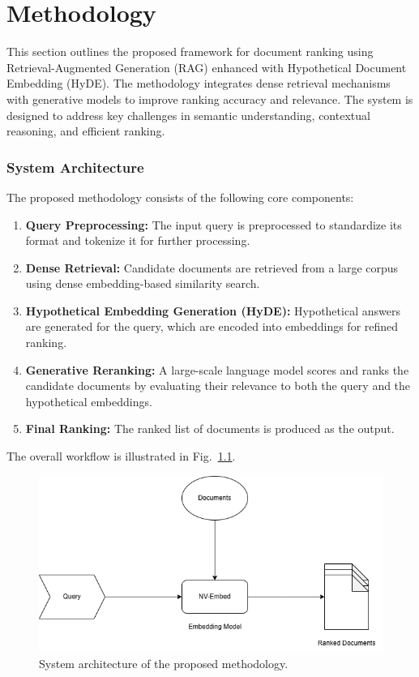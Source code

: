 \chapter{Methodology}
\label{C3} %
\clearpage

This section outlines the proposed framework for document ranking using Retrieval-Augmented Generation (RAG) enhanced with Hypothetical Document Embedding (HyDE). The methodology integrates dense retrieval mechanisms with generative models to improve ranking accuracy and relevance. The system is designed to address key challenges in semantic understanding, contextual reasoning, and efficient ranking.

\subsection{System Architecture}
The proposed methodology consists of the following core components:
\begin{enumerate}
    \item \textbf{Query Preprocessing:} The input query is preprocessed to standardize its format and tokenize it for further processing.
    \item \textbf{Dense Retrieval:} Candidate documents are retrieved from a large corpus using dense embedding-based similarity search.
    \item \textbf{Hypothetical Embedding Generation (HyDE):} Hypothetical answers are generated for the query, which are encoded into embeddings for refined ranking.
    \item \textbf{Generative Reranking:} A large-scale language model scores and ranks the candidate documents by evaluating their relevance to both the query and the hypothetical embeddings.
    \item \textbf{Final Ranking:} The ranked list of documents is produced as the output.
\end{enumerate}

The overall workflow is illustrated in Fig.~\ref{fig:system_architecture}.

\begin{figure}[ht]
    \centering
    \includegraphics[width=\linewidth]{IMAGE/RAG_archi.png} %
    \caption{System architecture of the proposed methodology.}
    \label{fig:system_architecture}
\end{figure}

